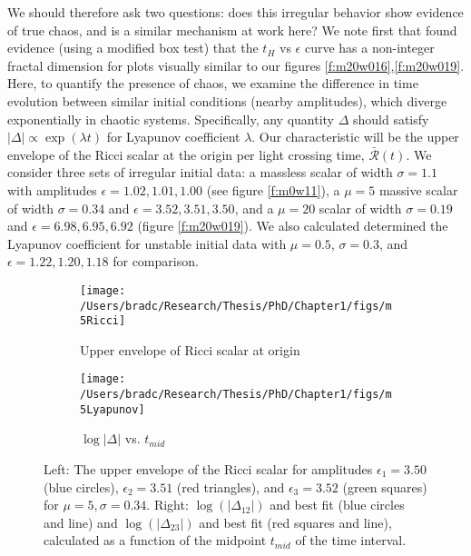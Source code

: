 \documentclass[../PhD.tex]{subfiles}
\begin{document}
We should therefore ask two questions: does this irregular behavior show
evidence of true chaos, and is a similar mechanism at work here? We note first
that \cite{1608.05402} found evidence (using a modified box test) that the
$t_H$ vs $\epsilon$ curve has a non-integer fractal dimension 
for plots visually similar to our figures \ref{f:m20w016},\ref{f:m20w019}.
Here, to quantify the presence of chaos, 
we examine the difference in time evolution between
similar initial conditions (nearby amplitudes), which diverge exponentially
in chaotic systems. Specifically, any quantity $\Delta$ should satisfy
$|\Delta| \propto \exp(\lambda t)$ for Lyapunov coefficient $\lambda$.
Our characteristic will be the
upper envelope of the Ricci scalar at the origin per light crossing time,
$\bar{\mathcal R}(t)$. We consider three sets of irregular initial data: 
a massless scalar of width $\sigma = 1.1$ with amplitudes
$\epsilon=1.02,1.01,1.00$ (see figure \ref{f:m0w11}),
a $\mu = 5$ massive scalar of width $\sigma = 0.34$ and
$\epsilon=3.52,3.51,3.50$, and a $\mu = 20$ scalar of width $\sigma = 0.19$
and $\epsilon=6.98,6.95,6.92$ (figure \ref{f:m20w019}). 
We also calculated determined the Lyapunov coefficient for unstable initial
data with $\mu=0.5$, $\sigma=0.3$, and $\epsilon=1.22,1.20,1.18$ for 
comparison.

\begin{figure}[!t]
\centering
\begin{subfigure}[t]{0.47\textwidth}
\texttt{[image: /Users/bradc/Research/Thesis/PhD/Chapter1/figs/m5Ricci]}
\caption{Upper envelope of Ricci scalar at origin}
\label{f:m5Ricci}
\end{subfigure}\hfill
\begin{subfigure}[t]{0.47\textwidth}
\texttt{[image: /Users/bradc/Research/Thesis/PhD/Chapter1/figs/m5Lyapunov]}
\caption{$\log | \Delta |$ vs. $t_{mid}$}
\label{f:m5Lyapunov}
\end{subfigure}
\caption[Evidence for chaotic evolution]{
Left: The upper envelope of the Ricci scalar for amplitudes
$\epsilon_1=3.50$ (blue circles), $\epsilon_2=3.51$ (red triangles), and
$\epsilon_3=3.52$ (green squares) for $\mu=5,\sigma=0.34$.
Right: $\log(|\Delta_{12}|)$ and best fit (blue
circles and line) and $\log(|\Delta_{23}|)$ and best fit (red squares and line),
calculated as a function of the midpoint $t_{mid}$ of the time interval.}
\label{f:m5chaotic}
\end{figure}
\end{document}
